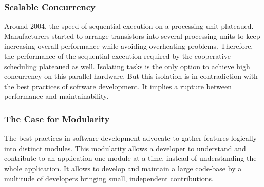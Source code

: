 \subsubsection{Scalable Concurrency}



Around 2004, the speed of sequential execution on a processing unit plateaued.
Manufacturers started to arrange transistors into several processing units to keep increasing overall performance while avoiding overheating problems.
Therefore, the performance of the sequential execution required by the cooperative scheduling plateaued as well.
Isolating tasks is the only option to achieve high concurrency on this parallel hardware.
But this isolation is in contradiction with the best practices of software development.
It implies a rupture between performance and maintainability.

\subsubsection{The Case for Modularity}

The best practices in software development advocate to gather features logically into distinct modules.
This modularity allows a developer to understand and contribute to an application one module at a time, instead of understanding the whole application.
It allows to develop and maintain a large code-base by a multitude of developers bringing small, independent contributions.



